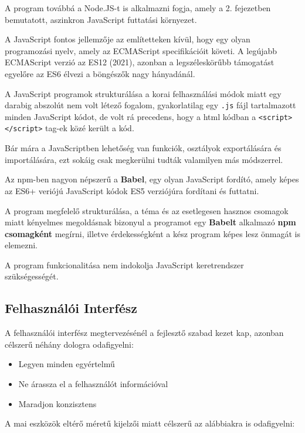 A program továbbá a Node.JS-t is alkalmazni fogja, amely a 2. fejezetben bemutatott, aszinkron JavaScript futtatási környezet.

A JavaScript fontos jellemzője az említetteken kívül, hogy egy olyan programozási nyelv, amely az ECMAScript specifikációit követi. A legújabb ECMAScript verzió az ES12 (2021), azonban a legszéleskörűbb támogatást egyelőre az ES6 élvezi a böngészők nagy hányadánál. 

A JavaScript programok strukturálása a korai felhasználási módok miatt egy darabig abszolút nem volt létező fogalom, gyakorlatilag egy \texttt{.js} fájl tartalmazott minden JavaScript kódot, de volt rá precedens, hogy a html kódban a \texttt{<script></script>} tag-ek közé került a kód.

Bár mára a JavaScriptben lehetőség van funkciók, osztályok exportálására és importálására, ezt sokáig csak megkerülni tudták valamilyen más módszerrel.

Az npm-ben nagyon népszerű a \textbf{Babel}, egy olyan JavaScript fordító, amely képes az ES6+ veriójú JavaScript kódok ES5 verziójúra fordítani és futtatni.

A program megfelelő strukturálása, a téma és az esetlegesen hasznos csomagok miatt kényelmes megoldásnak bizonyul a programot egy \textbf{Babelt} alkalmazó \textbf{npm csomagként} megírni, illetve érdekességként a kész program képes lesz önmagát is elemezni.

A program funkcionalitása nem indokolja JavaScript keretrendszer szükségességét.

\pagebreak


\subsection{Felhasználói Interfész}

A felhasználói interfész megtervezésénél a fejlesztő szabad kezet kap, azonban célszerű néhány dologra odafigyelni:

\begin{itemize}
	\item Legyen minden egyértelmű
	\item Ne árassza el a felhasználót információval
	\item Maradjon konzisztens
\end{itemize}

\noindent A mai eszközök eltérő méretű kijelzői miatt célszerű az alábbiakra is odafigyelni:

